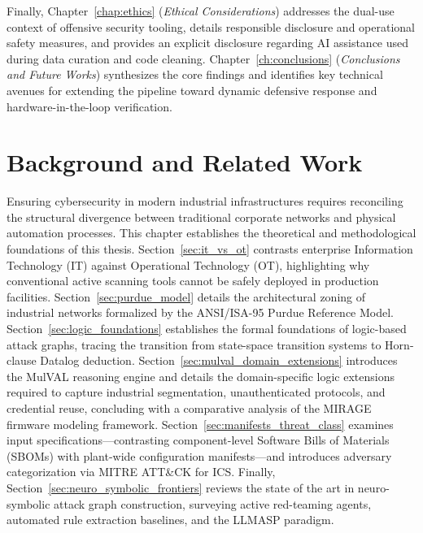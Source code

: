 \documentclass[target=mst,aauheader=aics,style=]{thud}
\begin{document}
Finally, Chapter~\ref{chap:ethics} (\textit{Ethical Considerations}) addresses the dual-use context of offensive security tooling, details responsible disclosure and operational safety measures, and provides an explicit disclosure regarding AI assistance used during data curation and code cleaning. Chapter~\ref{ch:conclusions} (\textit{Conclusions and Future Works}) synthesizes the core findings and identifies key technical avenues for extending the pipeline toward dynamic defensive response and hardware-in-the-loop verification.

\chapter{Background and Related Work}
\label{ch:background}

Ensuring cybersecurity in modern industrial infrastructures requires reconciling the structural divergence between traditional corporate networks and physical automation processes. This chapter establishes the theoretical and methodological foundations of this thesis. 
Section~\ref{sec:it_vs_ot} contrasts enterprise Information Technology (IT) against Operational Technology (OT), highlighting why conventional active scanning tools cannot be safely deployed in production facilities. 
Section~\ref{sec:purdue_model} details the architectural zoning of industrial networks formalized by the ANSI/ISA-95 Purdue Reference Model. 
Section~\ref{sec:logic_foundations} establishes the formal foundations of logic-based attack graphs, tracing the transition from state-space transition systems to Horn-clause Datalog deduction. 
Section~\ref{sec:mulval_domain_extensions} introduces the MulVAL reasoning engine and details the domain-specific logic extensions required to capture industrial segmentation, unauthenticated protocols, and credential reuse, concluding with a comparative analysis of the MIRAGE firmware modeling framework. 
Section~\ref{sec:manifests_threat_class} examines input specifications—contrasting component-level Software Bills of Materials (SBOMs) with plant-wide configuration manifests—and introduces adversary categorization via MITRE ATT\&CK for ICS. 
Finally, Section~\ref{sec:neuro_symbolic_frontiers} reviews the state of the art in neuro-symbolic attack graph construction, surveying active red-teaming agents, automated rule extraction baselines, and the LLMASP paradigm.
\end{document}
